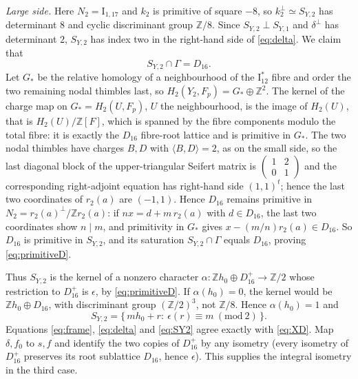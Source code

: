 \documentclass[12pt]{article}
\newcommand{\Z}{\mathbb Z}
\newcommand{\I}{\mathrm{I}}
\theoremstyle{definition}
\theoremstyle{remark}
\begin{document}
\emph{Large side.} Here \(N_2=\I_{1,17}\) and \(k_2\) is primitive of
square \(-8\), so \(k_2^\perp\simeq S_{Y,2}\) has determinant \(8\)
and cyclic discriminant group \(\Z/8\). Since
\(S_{Y,2}\perp S_{Y,1}\) and \(\delta^\perp\) has determinant \(2\),
\(S_{Y,2}\) has index two in the right-hand side of \eqref{eq:delta}.
We claim that
\begin{equation}\label{eq:primitiveD}
 S_{Y,2}\cap\Gamma=D_{16}.
\end{equation}
Let \(G_*\) be the relative homology of a neighbourhood of the
\(\I_{12}^*\) fibre and order the two remaining nodal thimbles last,
so \(H_2(Y_2,F_p)=G_*\oplus\Z^2\). The kernel of the charge map on
\(G_*=H_2(U,F_p)\), \(U\) the neighbourhood, is the image of
\(H_2(U)\), that is \(H_2(U)/\Z[F]\), which is spanned by the fibre
components modulo the total fibre: it is exactly the \(D_{16}\)
fibre-root lattice and is primitive in \(G_*\). The two nodal
thimbles have charges \(B,D\) with \(\langle B,D\rangle=2\), as on the
small side, so the last diagonal block of the upper-triangular Seifert
matrix is \(\left(\begin{smallmatrix}1&2\\0&1\end{smallmatrix}\right)\)
and the corresponding right-adjoint equation has right-hand side
\((1,1)^t\); hence the last two coordinates of \(r_2(a)\) are
\((-1,1)\). Hence \(D_{16}\) remains primitive in
\(N_2=r_2(a)^\perp/\Z r_2(a)\): if \(nx=d+m\,r_2(a)\) with
\(d\in D_{16}\), the last two coordinates show \(n\mid m\), and
primitivity in \(G_*\) gives \(x-(m/n)r_2(a)\in D_{16}\). So
\(D_{16}\) is primitive in \(S_{Y,2}\), and its saturation
\(S_{Y,2}\cap\Gamma\) equals \(D_{16}\), proving
\eqref{eq:primitiveD}.

Thus \(S_{Y,2}\) is the kernel of a nonzero character
\(\alpha\colon\Z h_0\oplus D_{16}^{+}\to\Z/2\) whose restriction to
\(D_{16}^+\) is \(\epsilon\), by \eqref{eq:primitiveD}. If
\(\alpha(h_0)=0\), the kernel would be \(\Z h_0\oplus D_{16}\), with
discriminant group \((\Z/2)^3\), not \(\Z/8\). Hence \(\alpha(h_0)=1\)
and
\begin{equation}\label{eq:SY2}
 S_{Y,2}=\{\,mh_0+r:\ \epsilon(r)\equiv m\ (\mathrm{mod}\ 2)\,\}.
\end{equation}
Equations \eqref{eq:frame}, \eqref{eq:delta} and \eqref{eq:SY2} agree
exactly with \eqref{eq:XD}. Map \(\delta,f_0\) to \(s,f\) and identify
the two copies of \(D_{16}^+\) by any isometry (every isometry of
\(D_{16}^+\) preserves its root sublattice \(D_{16}\), hence
\(\epsilon\)). This supplies the integral isometry in the third case.
\end{document}
